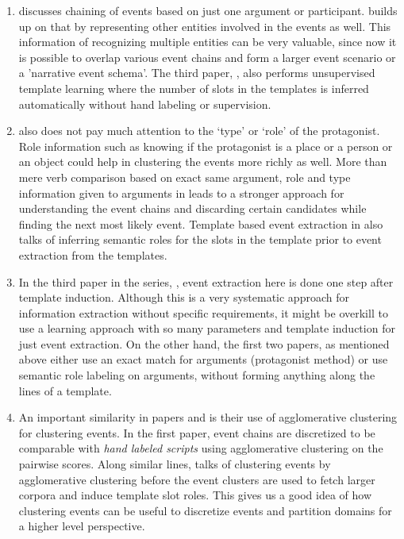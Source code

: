 \begin{enumerate}
\item {} \citeauthor{chju2008ec} discusses chaining of events based on just one argument or participant. \citeauthor{chju2009} builds up on that by representing other entities involved in the events as well. This information of recognizing multiple entities can be very valuable, since now it is possible to overlap various event chains and form a larger event scenario or a 'narrative event schema'. The third paper, \citeauthor{chju2011}, also performs unsupervised template learning where the number of slots in the templates is inferred automatically without hand labeling or supervision. 

\item {} \citeauthor{chju2008ec} also does not pay much attention to the ‘type’ or ‘role’ of the protagonist. Role information such as knowing if the protagonist is a place or a person or an object could help in clustering the events more richly as well. More than mere verb comparison based on exact same argument, role and type information given to arguments in \citeauthor{chju2009} leads to a stronger approach for understanding the event chains and discarding certain candidates while finding the next most likely event. Template based event extraction in \citeauthor{chju2011} also talks of inferring semantic roles for the slots in the template prior to event extraction from the templates.

\item {} In the third paper in the series, \citeauthor{chju2011}, event extraction here is done one step after template induction. Although this is a very systematic approach for information extraction without specific requirements, it might be overkill to use a learning approach with so many parameters and template induction for just event extraction. On the other hand, the first two papers, as mentioned above either use an exact match for arguments (protagonist method) or use semantic role labeling on arguments, without forming anything along the lines of a template.

\item {} An important similarity in papers \citeauthor{chju2008ec} and \citeauthor{chju2011} is their use of agglomerative clustering for clustering events. In the first paper, event chains are discretized to be comparable with {\em hand labeled scripts} using agglomerative clustering on the pairwise scores. Along similar lines, \citeauthor {chju2011} talks of clustering events by agglomerative clustering before the event clusters are used to fetch larger corpora and induce template slot roles. This gives us a good idea of how clustering events can be useful to discretize events and partition domains for a higher level perspective.
\end{enumerate}
 
